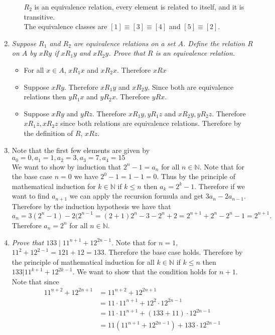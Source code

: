 \documentclass[12pt, letterpaper]{article}
\newcommand{\N}{\mathbb{N}}
\begin{document}
\begin{enumerate}
\begin{enumerate}
		 $R_2$ is an equivalence relation, every element is related to itself, and it is transitive.\\  The equivalence classes are $[1] \equiv [3] \equiv [4]$ and $[5] \equiv [2]$.
	\end{enumerate}
	\item \textit{Suppose $R_1$ and $R_2$ are equivalence relations on a set $A$. Define the relation $R$ on $A$ by $xRy$ if
$xR_1y$ and $xR_2y$. Prove that $R$ is an equivalence relation.}
	\begin{itemize}
		\item For all $x \in A$, $xR_1x$ and $xR_2x$.  Therefore $xRx$
		\item Suppose $xRy$.  Therefore $xR_1y$ and $xR_2y$.  Since both are equivalence relations then $yR_1x$ and $y R_2 x$.  Therefore $yRx$.
		\item Suppose $xRy$ and $yRz$.  Therefore $xR_1y, yR_1z$ and $xR_2y, yR_2z$.  Therefore $xR_1z, xR_2z$ since both relations are equivalence relations.
		Therefore by the definition of $R$, $xRz$.    
	\end{itemize}
	\item Note that the first few elements are given by
	$a_0 = 0, a_1 = 1, a_2 = 3, a_3 = 7, a_4 = 15$\\
	 We want to show by induction that $2^n - 1 = a_n$ for all $n \in \N$.  Note that for the base case $n=0$
	we have $2^0 - 1 = 1 -1 = 0$.  Thus by the principle of mathematical induction for $k \in \N$ if $k \leq n$ then $a_k = 2^k - 1$.  
	Therefore if we want to find $a_{n+1}$ we can apply the recursion formula and get $3a_{n} - 2a_{n-1}$.  Therefore by the induction hypothesis we have that $$a_n = 3(2^n - 1) - 2(2^{n-1} = (2+1)2^{n} - 3 - 2^n + 2 = 2^{n+1} + 2^{n}-2^n - 1 = 2^{n+1}.$$
	Therefore $a_n = 2^n$ for all $n \in \N$.   
	  
	\item \textit{Prove that $133 \mid 11^{n+1} + 12^{2n-1}$}.
	Note that for $n=1$, $11^2 + 12^{2-1} = 121+12 = 133$.  Therefore the base case holds.  Therefore by the principle of mathematical induction
	for all $k \in \N$ if $k \leq n$ then $133 | 11^{k+1} + 12^{2k-1}$.  
	We want to show that the condition holds for $n+1$.  Note that since
	\begin{align*}
	11^{n+2} + 12^{2n+1} &= 11^{n+2} + 12^{2n+1}\\ &= 11\cdot 11^{n+1} + 12^2 \cdot 12^{2n-1}\\ &= 11\cdot 11^{n+1} + (133 + 11) \cdot 12^{2n-1}\\
	&= 11(11^{n+1} +  12^{2n-1}) + 133 \cdot 12^{2n-1}
	\end{align*}
	

\end{enumerate}
\end{document}
